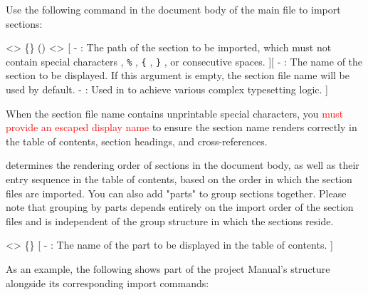 Use the following command in the document body of the main file to import sections:

<>{
    \{\}
    ()
    <>
}[
    -  : The path of the section to be imported, which must not contain special characters \texttt{\cs{}} , \texttt{\%} , \texttt{\{} , \texttt{\}} , or consecutive spaces.
][
    -  : The name of the section to be displayed. If this argument is empty, the section file name will be used by default.
    -  : Used in  to achieve various complex typesetting logic.
]

When the section file name contains unprintable special characters, you \textcolor{red}{must provide an escaped display name} to ensure the section name renders correctly in the table of contents, section headings, and cross-references.


\SimpleSystemTeX determines the rendering order of sections in the document body, as well as their entry sequence in the table of contents, based on the order in which the section files are imported. You can also add "parts" to group sections together. Please note that grouping by parts depends entirely on the import order of the section files and is independent of the group structure in which the sections reside.

\newpage

<>{
    \{\}
}[
    -  : The name of the part to be displayed in the table of contents.
]

As an example, the following shows part of the project \SimpleSystemTeX Manual's structure alongside its corresponding import commands:


